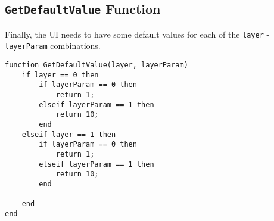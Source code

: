 \documentclass[../D+Manual.tex]{subfiles}
\begin{document}
\subsection{\lstinline|GetDefaultValue| Function}
Finally, the UI needs to have some default values for each of the \lstinline|layer| -  \lstinline|layerParam| combinations.

\begin{lstlisting}[basicstyle = \small]
function GetDefaultValue(layer, layerParam)
	if layer == 0 then
		if layerParam == 0 then
			return 1;
		elseif layerParam == 1 then
			return 10;
		end
	elseif layer == 1 then
		if layerParam == 0 then
			return 1;
		elseif layerParam == 1 then
			return 10;
		end
	
	end
end
\end{lstlisting}
\end{document}
